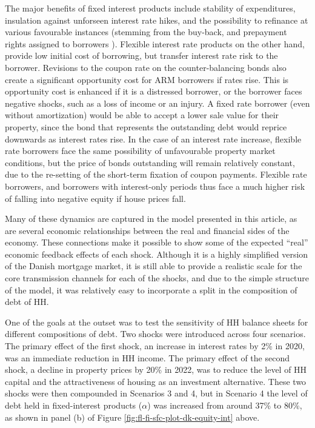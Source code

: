 \documentclass[
]{book}
\begin{document}
The major benefits of fixed interest products include stability of expenditures, insulation against unforseen interest rate hikes, and the possibility to refinance at various favourable instances (stemming from the buy-back, and prepayment rights assigned to borrowers \citep{Skinhoj2019}). Flexible interest rate products on the other hand, provide low initial cost of borrowing, but transfer interest rate risk to the borrower. Revisions to the coupon rate on the counter-balancing bonds also create a significant opportunity cost for ARM borrowers if rates rise. This is opportunity cost is enhanced if it is a distressed borrower, or the borrower faces negative shocks, such as a loss of income or an injury. A fixed rate borrower (even without amortization) would be able to accept a lower sale value for their property, since the bond that represents the outstanding debt would reprice downwards as interest rates rise. In the case of an interest rate increase, flexible rate borrowers face the same possibility of unfavourable property market conditions, but the price of bonds outstanding will remain relatively constant, due to the re-setting of the short-term fixation of coupon payments. Flexible rate borrowers, and borrowers with interest-only periods thus face a much higher risk of falling into negative equity if house prices fall.

Many of these dynamics are captured in the model presented in this article, as are several economic relationships between the real and financial sides of the economy. These connections make it possible to show some of the expected ``real'' economic feedback effects of each shock. Although it is a highly simplified version of the Danish mortgage market, it is still able to provide a realistic scale for the core transmission channels for each of the shocks, and due to the simple structure of the model, it was relatively easy to incorporate a split in the composition of debt of HH.

One of the goals at the outset was to test the sensitivity of HH balance sheets for different compositions of debt. Two shocks were introduced across four scenarios. The primary effect of the first shock, an increase in interest rates by 2\% in 2020, was an immediate reduction in HH income. The primary effect of the second shock, a decline in property prices by 20\% in 2022, was to reduce the level of HH capital and the attractiveness of housing as an investment alternative. These two shocks were then compounded in Scenarios 3 and 4, but in Scenario 4 the level of debt held in fixed-interest products (\(\alpha\)) was increased from around 37\% to 80\%, as shown in panel (b) of Figure \ref{fig:fl-fi-sfc-plot-dk-equity-int} above.
\end{document}
